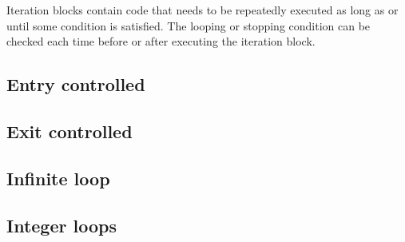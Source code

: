 \def\Subsection#1{\subsection{#1}}

Iteration blocks contain code that needs to be repeatedly
executed as long as or until some condition is satisfied.
The looping or stopping condition can be checked each
time before or after executing the iteration block.

\Subsection{Entry controlled}

\Subsection{Exit controlled}

\Subsection{Infinite loop}

\Subsection{Integer loops}
